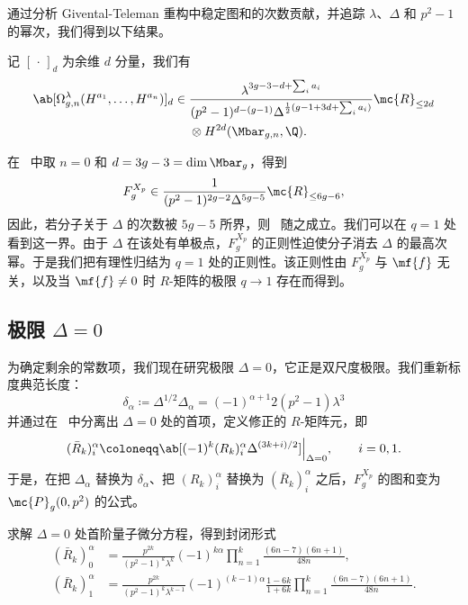 通过分析 Givental-Teleman 重构中稳定图和的次数贡献，并追踪 \(\lambda\)、\(\Delta\) 和 \(p^2-1\) 的幂次，我们得到以下结果。

\begin{thm}%
\label{thm:local P1 reconstruction}
    记 \([\,\cdot\,]_d\) 为余维 \(d\) 分量，我们有
    \begin{align*}
        \ab[\Omega^{\lambda}_{g,n}(H^{a_1},\ldots,H^{a_n})]_d \in{}& \frac{\lambda^{3g-3-d+\sum_i a_i}}{(p^2-1)^{d-(g-1)}\Delta^{\frac{1}{2}(g-1+3d+\sum_i a_i)}}\mc{R}_{\leq 2d} \\
        &\otimes H^{2d}(\Mbar_{g,n},\Q).
    \end{align*}
\end{thm}

在~ 中取 \(n=0\) 和 \(d = 3g-3 = \dim \Mbar_g\)，得到
\[ F_g^{X_p} \in \frac{1}{(p^2-1)^{2g-2}\Delta^{5g-5}}\mc{R}_{\leq 6g-6}, \]
因此，若分子关于 \(\Delta\) 的次数被 \(5g-5\) 所界，则~ 随之成立。我们可以在 \(q=1\) 处看到这一界。由于 \(\Delta\) 在该处有单极点，\(F_g^{X_p}\) 的正则性迫使分子消去 \(\Delta\) 的最高次幂。于是我们把有理性归结为 \(q=1\) 处的正则性。该正则性由 \(F_g^{X_p}\) 与 \(\mf{f}\) 无关，以及当 \(\mf{f} \neq 0\) 时 \(R\)-矩阵的极限 \(q \to 1\) 存在而得到。

\subsection{极限 \(\Delta = 0\)}%
\label{sub:The limit Delta = 0}

为确定剩余的常数项，我们现在研究极限 \(\Delta = 0\)，它正是双尺度极限。我们重新标度典范长度：
\[ \delta_{\alpha} \coloneqq \Delta^{1/2}\Delta_{\alpha} = (-1)^{\alpha+1}2(p^2-1)\lambda^3 \]
并通过在~ 中分离出 \(\Delta = 0\) 处的首项，定义修正的 \(R\)-矩阵元，即
\[ (\bar{R}_k)_i^{\alpha} \coloneqq \ab[(-1)^k (R_k)_i^{\alpha}\Delta^{(3k+i)/2}]\Big|_{\Delta=0}, \qquad i = 0,1. \]
于是，在把 \(\Delta_{\alpha}\) 替换为 \(\delta_{\alpha}\)、把 \((R_k)_i^{\alpha}\) 替换为 \((\bar{R}_k)_i^{\alpha}\) 之后，\(F_g^{X_p}\) 的图和变为 \(\mc{P}_g(0,p^2)\) 的公式。

\begin{lem}%
\label{lem:R matrix at Delta zero}
    求解 \(\Delta = 0\) 处首阶量子微分方程，得到封闭形式
    \begin{align*}
        (\bar{R}_k)_0^{\alpha} &= \frac{p^{2k}}{(p^2-1)^k\lambda^k}(-1)^{k\alpha}\prod_{n=1}^k \frac{(6n-7)(6n+1)}{48n}, \\
        (\bar{R}_k)_1^{\alpha} &= \frac{p^{2k}}{(p^2-1)^k \lambda^{k-1}}(-1)^{(k-1)\alpha}\frac{1-6k}{1+6k}\prod_{n=1}^k \frac{(6n-7)(6n+1)}{48n}.
    \end{align*}
\end{lem}

